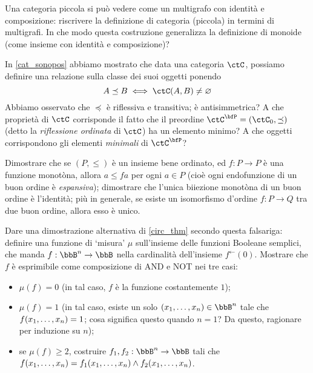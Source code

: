 \begin{esercizi}
	\item Una categoria piccola si può vedere come un multigrafo con identità e composizione: riscrivere la definizione di categoria (piccola) in termini di multigrafi.  In che modo questa costruzione generalizza la definizione di monoide (come insieme con identità e composizione)?
	\item In \ref{cat_sonopos} abbiamo mostrato che data una categoria \(\ctC\), possiamo definire una relazione sulla classe dei suoi oggetti ponendo
	\[A\preceq B \iff \Hom\ctC(A,B)\ne\varnothing\]
	Abbiamo osservato che \(\preceq\) è riflessiva e transitiva; è antisimmetrica? A che proprietà di \(\ctC\) corrisponde il fatto che il preordine \(\ctC^\bfP=(\ctC_0,\preceq)\) (detto la \emph{riflessione ordinata} di \(\ctC\)) ha un elemento minimo? A che oggetti corrispondono gli elementi \emph{minimali} di \(\ctC^\bfP\)?
	\item Dimostrare che se \((P,\le)\) è un insieme bene ordinato, ed \(f : P\to P\) è una funzione monotòna, allora \(a\le fa\) per ogni \(a\in P\) (cioè ogni endofunzione di un buon ordine è \emph{espansiva}); dimostrare che l'unica biiezione monotòna di un buon ordine è l'identità; più in generale, se esiste un isomorfismo d'ordine \(f : P\to Q\) tra due buon ordine, allora esso è unico.
	\item Dare una dimostrazione alternativa di \ref{circ_thm} secondo questa falsariga: definire una funzione di `misura' \(\mu\) sull'insieme delle funzioni Booleane semplici, che manda \(f : \bbB^n\to\bbB\) nella cardinalità dell'insieme \(f^\leftarrow(0)\). Mostrare che \(f\) è esprimibile come composizione di AND e NOT nei tre casi:
	\begin{itemize}
		\item \(\mu(f)=0\) (in tal caso, \(f\) è la funzione costantemente \(1\));
		\item \(\mu(f)=1\) (in tal caso, esiste un solo \((\tup xn,)\in \bbB^n\) tale che \(f(\tup xn,)=1\); cosa significa questo quando \(n=1\)? Da questo, ragionare per induzione su \(n\));
		\item se \(\mu(f)\ge 2\), costruire \(f_1,f_2:\bbB^n\to \bbB\) tali che \(f(\tup xn,) = f_1(\tup xn,) \land f_2(\tup xn,)\).
	\end{itemize}
\end{esercizi}
